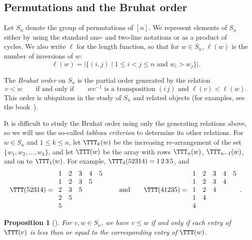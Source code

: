 \documentclass[12pt]{amsart}
\newtheorem{prop}[equation]{Proposition}
\theoremstyle{definition}
\theoremstyle{remark}
\numberwithin{equation}{section}
\begin{document}
\subsection{Permutations and the Bruhat order}
\label{sec:bruhat}

Let $S_n$ denote the group of permutations of $[n]$.  We represent elements of $S_{n}$ either by using the standard one- and two-line notations or as a product of cycles.  We also write $\ell$ for the length function, so that for $w \in S_{n}$, $\ell(w)$ is the number of inversions of $w$:
\[
\ell(w) = |\{(i, j) \;|\; \text{$1 \le i < j \le n$ and $w_{i} > w_{j}$}\}|.
\]

The \emph{Bruhat order} on $S_{n}$ is the partial order generated by the relation
\[
v < w \qquad\text{if and only if} \qquad \text{$wv^{-1}$ is a transposition $(i\,j)$ and $\ell(v) < \ell(w)$}.
\]
This order is ubiquitous in the study of $S_{n}$ and related objects (for examples, see the book~\cite{BjornerBrenti}).

It is difficult to study the Bruhat order using only the generating relations above, so we will use the so-called \emph{tableau criterion} to determine its other relations.  For $w \in S_{n}$ and $1 \le k \le n$, let $\TTT_{k}(w)$ be the increasing re-arrangement of the set $\{w_{1}, w_{2}, \ldots, w_{k}\}$, and let $\TTT(w)$ be the array with rows $\TTT_{n}(w)$, $\TTT_{n-1}(w)$, and on to $\TTT_{1}(w)$.  For example, $\TTT_{4}(52314) = 1\,2\,3\,5$, and
\[
\TTT(52314) = 
\begin{array}{ccccc} 
1 & 2 & 3 & 4 & 5 \\ 
1 & 2 & 3 & 5 \\ 
2 & 3 & 5 \\ 
2 & 5 \\ 
5
\end{array}
\qquad\text{and}\qquad
\TTT(41235) = \begin{array}{ccccc} 
1 & 2 & 3 & 4 & 5 \\ 
1 & 2 & 3 & 4 \\ 
1 & 2 & 4 \\ 
1 & 4 \\ 
4
\end{array}.
\]

\begin{prop}[{\cite[Theorem 2.6.3]{BjornerBrenti}}]
\label{TableauCriterion}
For $v, w \in S_{n}$, we have $v \le w$  if and only if each entry of $\TTT(v)$ is less than or equal to the corresponding entry of $\TTT(w)$.
\end{prop}
\end{document}
